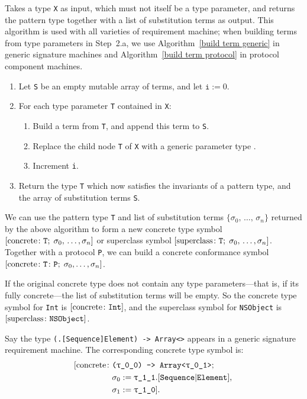\documentclass[../generics]{subfiles}
\begin{document}
\begin{algorithm}\label{concretesymbolcons}
Takes a type \texttt{X} as input, which must not itself be a type parameter, and returns the pattern type together with a list of substitution terms as output. This algorithm is used with all varieties of requirement machine; when building terms from type parameters in Step~2.a, we use Algorithm~\ref{build term generic} in generic signature machines and Algorithm~\ref{build term protocol} in protocol component machines.
\begin{enumerate}
\item Let \texttt{S} be an empty mutable array of terms, and let $\texttt{i}:=0$.
\item For each type parameter \texttt{T} contained in \texttt{X}:
\begin{enumerate}
\item Build a term from \texttt{T}, and append this term to \texttt{S}.
\item Replace the child node \texttt{T} of \texttt{X} with a generic parameter type .
\item Increment \texttt{i}.
\end{enumerate}
\item Return the type \texttt{T} which now satisfies the invariants of a pattern type, and the array of substitution terms \texttt{S}.
\end{enumerate}
\end{algorithm}
We can use the pattern type \texttt{T} and list of substitution terms $\{\sigma_0,\,\ldots,\,\sigma_n\}$ returned by the above algorithm to form a new concrete type symbol $[\mathrm{concrete}\colon \texttt{T};\;\sigma_0,\,\ldots,\sigma_n]$ or superclass symbol $[\mathrm{superclass}\colon \texttt{T};\;\sigma_0,\,\ldots,\sigma_n]$. Together with a protocol \texttt{P}, we can build a concrete conformance symbol $[\mathrm{concrete}\colon \texttt{T}\colon\texttt{P};\;\sigma_0,\ldots,\sigma_n]$.
\begin{example}
If the original concrete type does not contain any type parameters---that is, if its fully concrete---the list of substitution terms will be empty. So the concrete type symbol for \texttt{Int} is $[\mathrm{concrete}\colon \texttt{Int}]$, and the superclass symbol for \texttt{NSObject} is $[\mathrm{superclass}\colon \texttt{NSObject}]$.
\end{example}
\begin{example}
Say the type \texttt{(.[Sequence]Element) -> Array<>} appears in a generic signature requirement machine. The corresponding concrete type symbol is:
\begin{align*}
[\mathrm{concrete}\colon &\texttt{(\texttt{$\uptau$\_0\_0}) -> Array<\texttt{$\uptau$\_0\_1}>};\;\\
&\sigma_0 := \texttt{$\uptau$\_1\_1}.[\texttt{Sequence}|\texttt{Element}],\,\\
&\sigma_1 := \texttt{$\uptau$\_1\_0}].
\end{align*}
\end{example}
\end{document}
